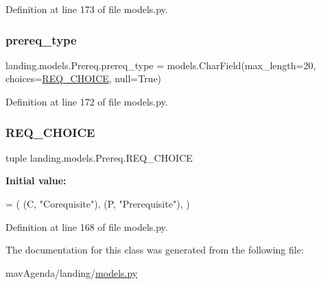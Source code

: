 Definition at line 173 of file models.\+py.

\mbox{\label{classlanding_1_1models_1_1Prereq_a32ccec77ab248409d6aecb58de5d57bb}} 
\subsubsection{\texorpdfstring{prereq\+\_\+type}{prereq\_type}}
{\footnotesize\ttfamily landing.\+models.\+Prereq.\+prereq\+\_\+type = models.\+Char\+Field(max\+\_\+length=20, choices=\mbox{\hyperlink{classlanding_1_1models_1_1Prereq_a04e7ec750245a108149ff8680c846509}{R\+E\+Q\+\_\+\+C\+H\+O\+I\+CE}}, null=True)\hspace{0.3cm}{\ttfamily [static]}}



Definition at line 172 of file models.\+py.

\mbox{\label{classlanding_1_1models_1_1Prereq_a04e7ec750245a108149ff8680c846509}} 
\subsubsection{\texorpdfstring{R\+E\+Q\+\_\+\+C\+H\+O\+I\+CE}{REQ\_CHOICE}}
{\footnotesize\ttfamily tuple landing.\+models.\+Prereq.\+R\+E\+Q\+\_\+\+C\+H\+O\+I\+CE\hspace{0.3cm}{\ttfamily [static]}}

{\bfseries Initial value\+:}
\begin{DoxyCode}
=  (
        (C, \textcolor{stringliteral}{"Corequisite"}),
        (P, \textcolor{stringliteral}{"Prerequisite"}),
    )
\end{DoxyCode}


Definition at line 168 of file models.\+py.



The documentation for this class was generated from the following file\+:\begin{DoxyCompactItemize}
\item 
mav\+Agenda/landing/\mbox{\hyperlink{models_8py}{models.\+py}}\end{DoxyCompactItemize}
